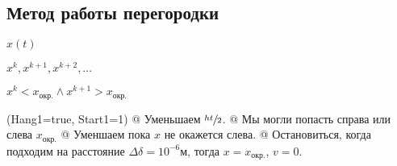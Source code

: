 \documentclass[12pt, a4paper]{article}
\begin{document}
\begin{tabu}{XX}
&

\noindent{}

\\ \hline
\end{tabu}

\subsection{Метод работы перегородки}

$ x(t) $

$ x^k, x^{k+1}, x^{k+2}, \dots $

$ x^k < x_\text{окр.} \wedge x^{k+1} > x_\text{окр.} $

\noindent\begin{easylist}
\ListProperties(Hang1=true, Start1=1)
@ Уменьшаем $\sfrac{ht}{2}$.
@ Мы могли попасть справа или слева $x_\text{окр.}$
@ Уменшаем пока $x$ не окажется слева.
@ Остановиться, когда подходим на расстояние $\Delta\delta = 10^{-6} \text{м}$, тогда $x = x_{\text{окр.}}$, $v = 0$.
\end{easylist}
\end{document}
